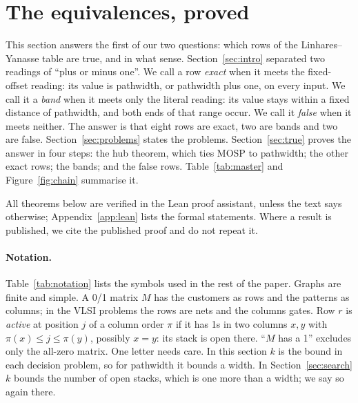 \section{The equivalences, proved}
\label{sec:equiv}

This section answers the first of our two questions: which rows of the
Linhares--Yanasse table are true, and in what sense. Section~\ref{sec:intro}
separated two readings of ``plus or minus one''. We call a row \emph{exact}
when it meets the fixed-offset reading: its value is pathwidth, or pathwidth
plus one, on every input. We call it a \emph{band} when it meets only the
literal reading: its value stays within a fixed distance of pathwidth, and
both ends of that range occur. We call it \emph{false} when it meets neither.
The answer is that eight rows are exact, two are bands and two are false.
Section~\ref{sec:problems} states the problems. Section~\ref{sec:true} proves
the answer in four steps: the hub theorem, which ties MOSP to pathwidth; the
other exact rows; the bands; and the false rows. Table~\ref{tab:master} and
Figure~\ref{fig:chain} summarise it.

All theorems below are verified in the Lean proof assistant, unless the text
says otherwise; Appendix~\ref{app:lean} lists the formal statements. Where a
result is published, we cite the published proof and do not repeat it.

\paragraph{Notation.} Table~\ref{tab:notation} lists the symbols used in the
rest of the paper. Graphs are finite and simple. A 0/1 matrix $M$ has the
customers as rows and the patterns as columns; in the VLSI problems the rows
are nets and the columns gates. Row $r$ is \emph{active} at position $j$ of a
column order $\pi$ if it has 1s in two columns $x,y$ with
$\pi(x)\le j\le\pi(y)$, possibly $x=y$: its stack is open there. ``$M$ has a
1'' excludes only the all-zero matrix. One letter needs care. In this section
$k$ is the bound in each decision problem, so for pathwidth it bounds a width.
In Section~\ref{sec:search} $k$ bounds the number of open stacks, which is one
more than a width; we say so again there.

